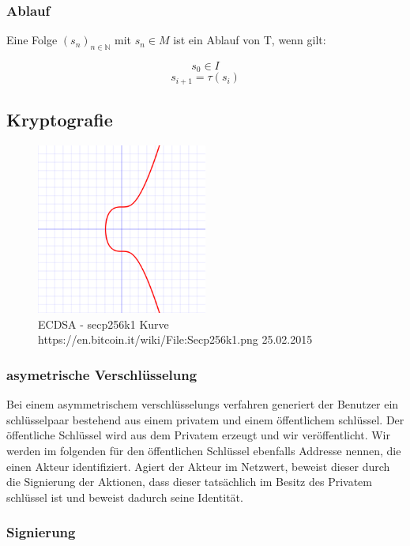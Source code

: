 \documentclass[a4paper,12pt]{report}
\begin{document}
\subsubsection*{Ablauf}
Eine Folge $(s_n)_{n\in\mathbb{N}}$ mit $s_n\in M$ ist ein Ablauf von T, wenn gilt:

\[ s_0 \in I \] 
\[ s_{i+1} = \tau(s_i) \] 


\subsection{Kryptografie}

\begin{figure}[ht]
    \centering
    \includegraphics[width=0.50\textwidth]{bilder/Secp256k1.png}
    \caption{ECDSA - secp256k1 Kurve https://en.bitcoin.it/wiki/File:Secp256k1.png 25.02.2015}
\end{figure}


\subsubsection*{asymetrische Verschlüsselung}
Bei einem asymmetrischem verschlüsselungs verfahren generiert der Benutzer ein schlüsselpaar bestehend aus einem privatem und einem öffentlichem schlüssel. Der öffentliche Schlüssel wird aus dem Privatem erzeugt und wir veröffentlicht. Wir werden im folgenden für den öffentlichen Schlüssel ebenfalls Addresse nennen, die einen Akteur identifiziert. Agiert der Akteur im Netzwert, beweist dieser durch die Signierung der Aktionen, dass dieser tatsächlich im Besitz des Privatem schlüssel ist und beweist dadurch seine Identität.

\subsubsection*{Signierung}
\end{document}
